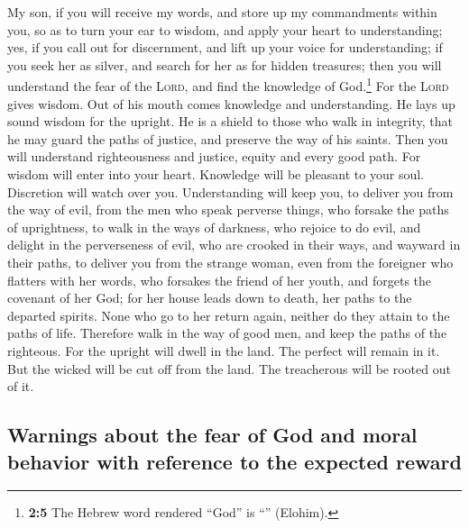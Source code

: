  My son, if you will receive my words, and store up my
commandments within you,  so as to turn your ear to
wisdom, and apply your heart to understanding;  yes, if
you call out for discernment, and lift up your voice for understanding;
 if you seek her as silver, and search for her as for
hidden treasures;  then you will understand the fear of
the \textsc{Lord}, and find the knowledge of God.\footnote{\textbf{2:5}
  The Hebrew word rendered ``God'' is ``'' (Elohim).}
 For the \textsc{Lord} gives wisdom. Out of his mouth
comes knowledge and understanding.  He lays up sound
wisdom for the upright. He is a shield to those who walk in integrity,
 that he may guard the paths of justice, and preserve the
way of his saints.  Then you will understand righteousness
and justice, equity and every good path.  For wisdom will
enter into your heart. Knowledge will be pleasant to your soul.
 Discretion will watch over you. Understanding will keep
you,  to deliver you from the way of evil, from the men
who speak perverse things,  who forsake the paths of
uprightness, to walk in the ways of darkness,  who
rejoice to do evil, and delight in the perverseness of evil,
 who are crooked in their ways, and wayward in their
paths,  to deliver you from the strange woman, even from
the foreigner who flatters with her words,  who forsakes
the friend of her youth, and forgets the covenant of her God;
 for her house leads down to death, her paths to the
departed spirits.  None who go to her return again,
neither do they attain to the paths of life.  Therefore
walk in the way of good men, and keep the paths of the righteous.
 For the upright will dwell in the land. The perfect will
remain in it.  But the wicked will be cut off from the
land. The treacherous will be rooted out of it.

\hypertarget{warnings-about-the-fear-of-god-and-moral-behavior-with-reference-to-the-expected-reward}{%
\subsection{Warnings about the fear of God and moral behavior with
reference to the expected
reward}\label{warnings-about-the-fear-of-god-and-moral-behavior-with-reference-to-the-expected-reward}}

